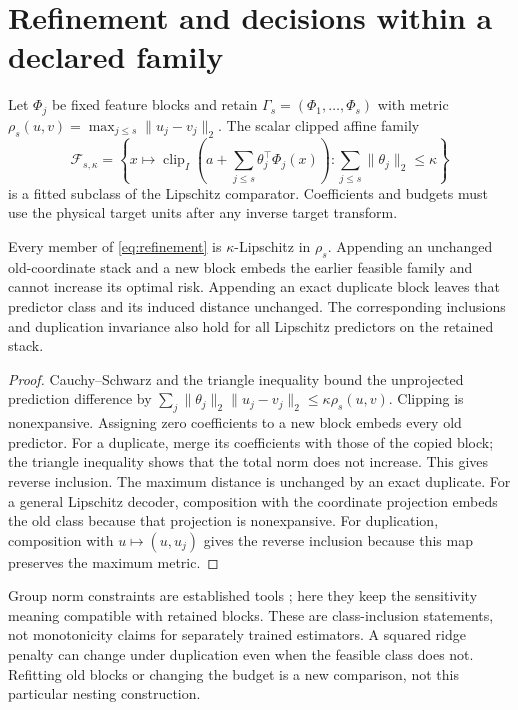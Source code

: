 \section{Refinement and decisions within a declared family}
\label{sec:decisions}

Let $\Phi_j$ be fixed feature blocks and retain
$\Gamma_s=(\Phi_1,\ldots,\Phi_s)$ with metric
$\rho_s(u,v)=\max_{j\leq s}\|u_j-v_j\|_2$.
The scalar clipped affine family
\begin{equation}
 \mathcal F_{s,\kappa}
 =\left\{x\mapsto\operatorname{clip}_I\!\left(
 a+\sum_{j\leq s}\theta_j^\top\Phi_j(x)\right):
             \sum_{j\leq s}\|\theta_j\|_2\leq\kappa\right\}
 \label{eq:refinement}
\end{equation}
is a fitted subclass of the Lipschitz comparator. Coefficients and budgets
must use the physical target units after any inverse target transform.

\begin{proposition}
\label{prop:refinement}
Every member of \eqref{eq:refinement} is $\kappa$-Lipschitz in
$\rho_s$. Appending an unchanged old-coordinate stack and a new block
embeds the earlier feasible family and cannot increase its optimal risk.
Appending an exact duplicate block leaves that predictor class and its
induced distance unchanged. The corresponding inclusions and duplication
invariance also hold for all Lipschitz predictors on the retained stack.
\end{proposition}

\begin{proof}
Cauchy--Schwarz and the triangle inequality bound the unprojected
prediction difference by
$\sum_j\|\theta_j\|_2\|u_j-v_j\|_2\leq\kappa\rho_s(u,v)$.
Clipping is nonexpansive. Assigning zero coefficients to a new block embeds
every old predictor. For a duplicate, merge its coefficients with those
of the copied block; the triangle inequality shows that the total norm
does not increase. This gives reverse inclusion. The maximum distance is
unchanged by an exact duplicate. For a general Lipschitz decoder,
composition with the coordinate projection embeds the old class because
that projection is nonexpansive. For duplication, composition with
$u\mapsto(u,u_j)$ gives the reverse inclusion because this map preserves
the maximum metric.
\end{proof}

Group norm constraints are established tools \citep{bach2008group}; here
they keep the sensitivity meaning compatible with retained blocks. These
are class-inclusion statements, not monotonicity claims for separately
trained estimators. A squared ridge penalty can change under duplication
even when the feasible class does not. Refitting old blocks or changing the
budget is a new comparison, not this particular nesting construction.

